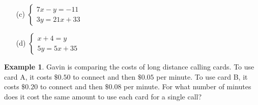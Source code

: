 \documentclass{report}
\theoremstyle{definition}
\newtheorem{example}{\bf Example}
\begin{document}
\vspace{1cm}

\begin{minipage}{0.45\linewidth}
\begin{itemize}
    \item[(c)] 
        $\begin{cases}
            7x-y=-11 \\
            3y=21x+33
        \end{cases}$\\
\end{itemize}    
\end{minipage}
\hspace{1cm}
\begin{minipage}{0.45\linewidth}
\begin{itemize}
    \item[(d)] 
        $\begin{cases}
            x+4=y \\
            5y=5x+35
        \end{cases}$\\
\end{itemize}    
\end{minipage}

\vspace{1cm}

\begin{example}
Gavin is comparing the costs of long distance calling cards. To use card A, it costs $\$0.50$ to connect and then $\$0.05$ per minute.  To use card B, it costs $\$0.20$ to connect and then $\$0.08$ per minute. For what number of minutes does it cost the same amount to use each card for a single call?
\end{example}
\begin{flushright}
\end{flushright}
\vfill

\noindent\large{}



 \newpage
\end{document}
